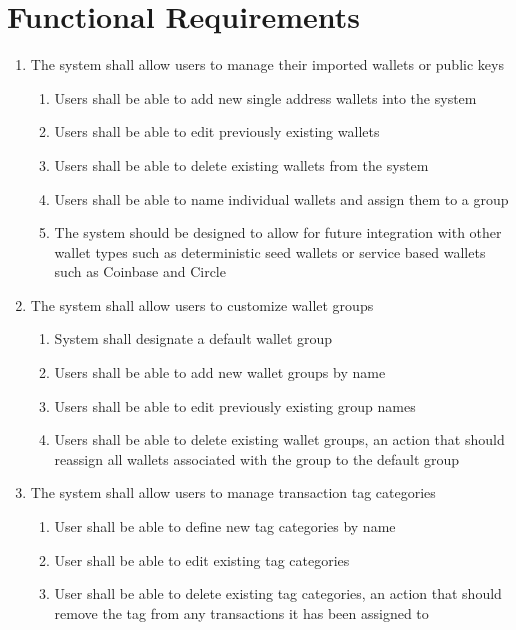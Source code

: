 \section{Functional Requirements}
\begin{adjustwidth}{1.5em}{0pt}

	\begin{enumerate}
	
		\item The system shall allow users to manage their imported wallets or public keys
		\begin{enumerate}
			\item Users shall be able to add new single address wallets into the system
			\item Users shall be able to edit previously existing wallets
			\item Users shall be able to delete existing wallets from the system
			\item Users shall be able to name individual wallets and assign them to a group
			\item The system should be designed to allow for future integration with other wallet types such as deterministic seed wallets or service based wallets such as Coinbase and Circle
		\end{enumerate}
		
		\item The system shall allow users to customize wallet groups
		\begin{enumerate}
			\item System shall designate a default wallet group
			\item Users shall be able to add new wallet groups by name
			\item Users shall be able to edit previously existing group names
			\item Users shall be able to delete existing wallet groups, an action that should reassign all wallets associated with the group to the default group
		\end{enumerate}
		
		\item The system shall allow users to manage transaction tag categories
		\begin{enumerate}
			\item User shall be able to define new tag categories by name
			\item User shall be able to edit existing tag categories
			\item User shall be able to delete existing tag categories, an action that should remove the tag from any transactions it has been assigned to
		\end{enumerate}
		

\end{enumerate}
\end{adjustwidth}
